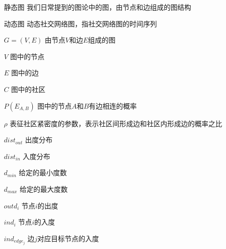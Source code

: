 
\begin{denotation}[3cm]
\item[静态图] 我们日常提到的图论中的图，由节点和边组成的图结构
\item[动态图] 动态社交网络图，指社交网络图的时间序列
\item[$G=(V,E)$] 由节点$V$和边$E$组成的图
\item[$V$] 图中的节点
\item[$E$] 图中的边
\item[$C$] 图中的社区
\item[$P\left(E_{A,B}\right)$] 图中的节点$A$和$B$有边相连的概率
\item[$\rho$] 表征社区紧密度的参数，表示社区间形成边和社区内形成边的概率之比
\item[$dist_{out}$] 出度分布
\item[$dist_{in}$] 入度分布
\item[$d_{min}$] 给定的最小度数
\item[$d_{max}$] 给定的最大度数
\item[$outd_i$] 节点$i$的出度
\item[$ind_i$] 节点$i$的入度
\item[$ind_{edge_j}$] 边$j$对应目标节点的入度
\end{denotation}
